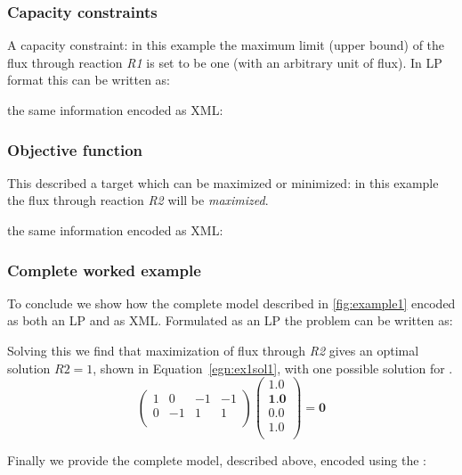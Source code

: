 \subsubsection{Capacity constraints}
\label{examples1:fluxbound}
A capacity constraint: in this example the maximum limit (upper bound)
of the flux through reaction \textit{R1} is set to be one (with an
arbitrary unit of flux). In LP format this can be written as:

%
%
the same information encoded as XML:
%

\subsubsection{Objective function}
\label{examples1:objfunc}
This described a target which can be maximized or minimized: in this
example the flux through reaction \textit{R2} will be
\textit{maximized}.

%
%
the same information encoded as XML:
%

\subsubsection{Complete worked example}
\label{examples1:complete}
To conclude we show how the complete model described in
\ref{fig:example1} encoded as both an LP and as XML. Formulated as an LP
the problem can be written as:

%
%
Solving this we find that maximization of flux through \textit{R2}
gives an optimal solution $R2 = 1$, shown in Equation~\ref{egn:ex1sol1}, with one possible solution
for \Jvec.
\begin{equation}\label{egn:ex1sol1}
  \left(
    \begin{array}{cccc}
        1 &  0 & -1 & -1 \\
        0 & -1 &  1 &  1 \\
    \end{array}
  \right)
  \left(
    \begin{array}{c}
        1.0 \\
        \textbf{1.0} \\
        0.0 \\
        1.0 \\
    \end{array}
  \right)
  = \textbf{0}
\end{equation}

Finally we provide the complete model, described above, encoded using the \FBCPackage:
%
